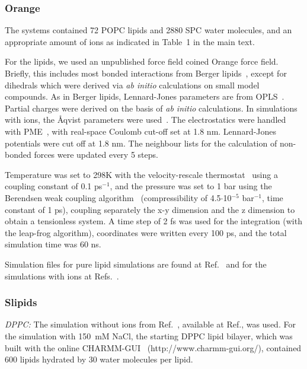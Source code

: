 \documentclass[twoside,twocolumn,9pt]{article}
\begin{document}
\subsubsection{Orange}
The systems contained 72 POPC lipids and 2880 SPC water molecules, and an appropriate amount of ions as indicated in 
Table~1 in the main text.  

For the lipids, we used an unpublished force field coined Orange force field. 
Briefly, this includes most bonded interactions from Berger lipids~\cite{berger97}, 
except for dihedrals which were derived via \textit{ab initio} calculations on small model compounds. 
As in Berger lipids, Lennard-Jones parameters are from OPLS~\cite{jorgensen84,jorgensen86a,jorgensen86b,jorgensen88,briggs91}.
Partial charges were derived on the basis of \textit{ab initio} calculations. 
In simulations with ions, the \r{A}qvist parameters were used~\cite{aqvist90}. 
The electrostatics were handled with PME~\cite{darden93,essman95}, with real-space Coulomb cut-off set at 1.8 nm. 
Lennard-Jones potentials were cut off at 1.8 nm. 
The neighbour lists for the calculation of non-bonded forces were updated every 5 steps.

Temperature was set to 298K with the velocity-rescale thermostat~\cite{bussi07} using a coupling constant of 0.1 ps$^{-1}$, and the pressure was set to 1 
bar using the Berendsen weak coupling algorithm~\cite{berendsen84} (compressibility of 4.5$\cdot$10$^{-5}$ bar$^{-1}$, time constant of 1 ps), coupling separately the x-y dimension and the z dimension to obtain a tensionless system. 
A time step of 2 fs was used for the integration (with the leap-frog algorithm), coordinates were written every 100 ps, 
and the total simulation time was 60 ns. 

Simulation files for pure lipid simulations are found at Ref.~ and for the simulations with ions at Refs.~.


\subsubsection{Slipids}
{\it DPPC:} The simulation without ions from Ref.~, available at Ref., was used. 
For the simulation with 150~mM NaCl, the starting DPPC lipid bilayer, which was built with the online CHARMM-GUI~\cite{lee15}
(http://www.charmm-gui.org/), contained 600 lipids hydrated by 30 water molecules per lipid. 
\end{document}
